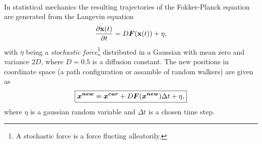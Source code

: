 \\
\noindent
In statistical mechanics the resulting trajectories of the Fokker-Planck equation are generated from the Langevin equation \cite{Thijssen}
\begin{equation}
\frac{\partial {\bf x}(t)}{\partial t} = D {\boldsymbol{F}}({\bf x}(t)) + \eta,
\end{equation}
with $\eta$ being a {\sl stochastic force}\footnote{A stochastic force is a force flucting alleatorily.} distributed in a Gaussian with mean zero and va\-rian\-ce $2D$, where $D=0.5$ is a diffusion constant. The new positions in coordinate space (a path configuration or assamble of random walkers) are given as 
\begin{equation}
\boxed{\boldsymbol{x^{new}} = \boldsymbol{x^{cur}} + D \boldsymbol{F}(\boldsymbol{x^{new}}) \Delta t + \eta,}
\end{equation}
where $\eta$ is a gaussian random variable and $\Delta t$ is a chosen time step. 



